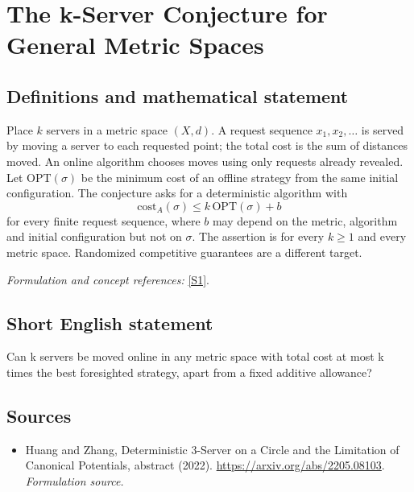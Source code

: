\documentclass[11pt]{article}
\begin{document}
\section*{\texorpdfstring{The k-Server Conjecture for General Metric Spaces}{The k-Server Conjecture for General Metric Spaces}}\label{30006820}
\subsection{Definitions and mathematical statement}
Place $k$ servers in a metric space $(X,d)$. A request sequence $x_1,x_2,\ldots$ is served by moving a server to each requested point; the total cost is the sum of distances moved. An online algorithm chooses moves using only requests already revealed. Let $\mathrm{OPT}(\sigma)$ be the minimum cost of an offline strategy from the same initial configuration. The conjecture asks for a deterministic algorithm with
\[
 \mathrm{cost}_A(\sigma)\le k\,\mathrm{OPT}(\sigma)+b
\]
for every finite request sequence, where $b$ may depend on the metric, algorithm and initial configuration but not on $\sigma$. The assertion is for every $k\ge1$ and every metric space. Randomized competitive guarantees are a different target.
\par\smallskip\textit{Formulation and concept references:} \href{https://arxiv.org/abs/2205.08103}{[S1]}.

\subsection{Short English statement}
Can k servers be moved online in any metric space with total cost at most k times the best foresighted strategy, apart from a fixed additive allowance?
\subsection{Sources}
\begin{itemize}
\item[S1]Huang and Zhang, Deterministic 3-Server on a Circle and the Limitation of Canonical Potentials, abstract (2022).
\url{https://arxiv.org/abs/2205.08103}.
\textit{Formulation source.}
\end{itemize}
\end{document}
